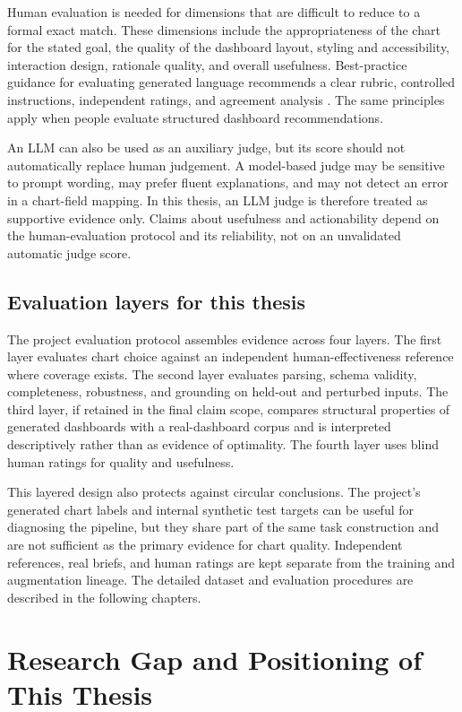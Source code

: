 Human evaluation is needed for dimensions that are difficult to reduce to a formal exact match. These dimensions include the appropriateness of the chart for the stated goal, the quality of the dashboard layout, styling and accessibility, interaction design, rationale quality, and overall usefulness. Best-practice guidance for evaluating generated language recommends a clear rubric, controlled instructions, independent ratings, and agreement analysis \cite{vanderlee2019human}. The same principles apply when people evaluate structured dashboard recommendations.

An LLM can also be used as an auxiliary judge, but its score should not automatically replace human judgement. A model-based judge may be sensitive to prompt wording, may prefer fluent explanations, and may not detect an error in a chart-field mapping. In this thesis, an LLM judge is therefore treated as supportive evidence only. Claims about usefulness and actionability depend on the human-evaluation protocol and its reliability, not on an unvalidated automatic judge score.

\subsection{Evaluation layers for this thesis}

The project evaluation protocol assembles evidence across four layers. The first layer evaluates chart choice against an independent human-effectiveness reference where coverage exists. The second layer evaluates parsing, schema validity, completeness, robustness, and grounding on held-out and perturbed inputs. The third layer, if retained in the final claim scope, compares structural properties of generated dashboards with a real-dashboard corpus and is interpreted descriptively rather than as evidence of optimality. The fourth layer uses blind human ratings for quality and usefulness.

This layered design also protects against circular conclusions. The project's generated chart labels and internal synthetic test targets can be useful for diagnosing the pipeline, but they share part of the same task construction and are not sufficient as the primary evidence for chart quality. Independent references, real briefs, and human ratings are kept separate from the training and augmentation lineage. The detailed dataset and evaluation procedures are described in the following chapters.

\section{Research Gap and Positioning of This Thesis}

